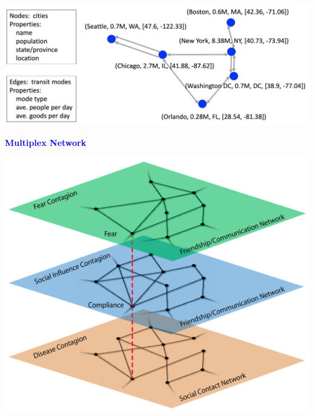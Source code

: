 \documentclass[landscape,paperwidth=70in,paperheight=46in,fontscale=0.225]{baposter} %
\begin{document}
\begin{poster}
{\begin{minipage}{.5\textwidth}
\centering
\includegraphics[scale=0.25]{figures/single_net.png}
\end{minipage}
\hfill
 \begin{minipage}{.35\textwidth}   
 \textcolor{blue}{\textbf{Multiplex Network}}
 \vspace{3mm}
 
 \centering
\includegraphics[scale=0.35]{figures/multi_net.png}
\end{minipage}
}



\end{poster}
\end{document}
